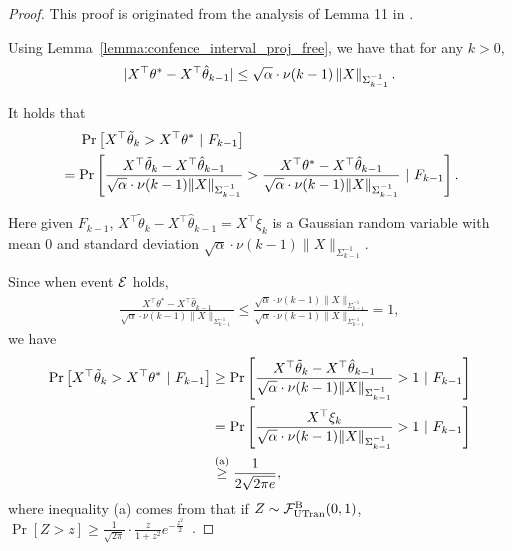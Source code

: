 \begin{proof}
	This proof is originated from the analysis of Lemma 11 in \cite{efroni2021reinforcement}. 
	
	Using Lemma~\ref{lemma:confence_interval_proj_free}, we have that for any $k>0$,
	\begin{align*}
		|X^\top \theta^* - X^\top \hat{\theta}_{k-1}| \leq  \sqrt{\alpha} \cdot \nu(k-1) \left\| X \right\|_{\Sigma_{k-1}^{-1}}  .
	\end{align*}
	
	It holds that
	\begin{align*}
		&\quad\ \Pr\left[  X^\top \tilde{\theta}_k > X^\top \theta^* \ |\ F_{k-1}  \right]
		\\
		&= \Pr\left[  \frac{X^\top \tilde{\theta}_k - X^\top \hat{\theta}_{k-1} }{ \sqrt{\alpha} \cdot \nu(k-1) \|X\|_{\Sigma_{k-1}^{-1}} } > \frac{X^\top \theta^* - X^\top \hat{\theta}_{k-1} }{ \sqrt{\alpha} \cdot \nu(k-1) \|X\|_{\Sigma_{k-1}^{-1}} } \ |\ F_{k-1}  \right] .
	\end{align*}
	
	Here given $F_{k-1}$, $X^\top \tilde{\theta}_k - X^\top \hat{\theta}_{k-1} = X^\top \xi_k$ is a Gaussian random variable with mean $0$ and standard deviation $\sqrt{\alpha} \cdot \nu(k-1) \|X\|_{\Sigma_{k-1}^{-1}}$.
	
	Since when event $\mathcal{E}$ holds,
	\begin{align*}
		\frac{X^\top \theta^* - X^\top \hat{\theta}_{k-1}}{ \sqrt{\alpha} \cdot \nu(k-1) \|X\|_{\Sigma_{k-1}^{-1}} }  \leq \frac{ \sqrt{\alpha} \cdot \nu(k-1) \|X\|_{\Sigma_{k-1}^{-1}} }{ \sqrt{\alpha} \cdot \nu(k-1) \|X\|_{\Sigma_{k-1}^{-1}} } =1 ,
	\end{align*}
	we have
	\begin{align*}
		\Pr\mbr{ X^\top \tilde{\theta}_k > X^\top \theta^* \ |\ F_{k-1} }
		&\geq \Pr\mbr{ \frac{X^\top \tilde{\theta}_k - X^\top \hat{\theta}_{k-1}}{ \sqrt{\alpha} \cdot \nu(k-1) \|X\|_{\Sigma_{k-1}^{-1}} } > 1 \ |\ F_{k-1} }
		\\
		&= \Pr\mbr{ \frac{ X^\top \xi_k }{ \sqrt{\alpha} \cdot \nu(k-1) \|X\|_{\Sigma_{k-1}^{-1}} } > 1 \ |\ F_{k-1} }
		\\
		&\overset{\textup{(a)}}{\geq} \frac{1}{2\sqrt{2\pi e}} ,
	\end{align*}
	where inequality (a) comes from that if $Z \sim \mathcal{F}^{\textup{B}}_{\textup{UTran}}(0,1)$,  $\Pr[Z>z]\geq \frac{1}{\sqrt{2\pi}} \cdot \frac{z}{1+z^2} e^{-\frac{z^2}{2}}$~\cite{borjesson1979simple}.
\end{proof}


